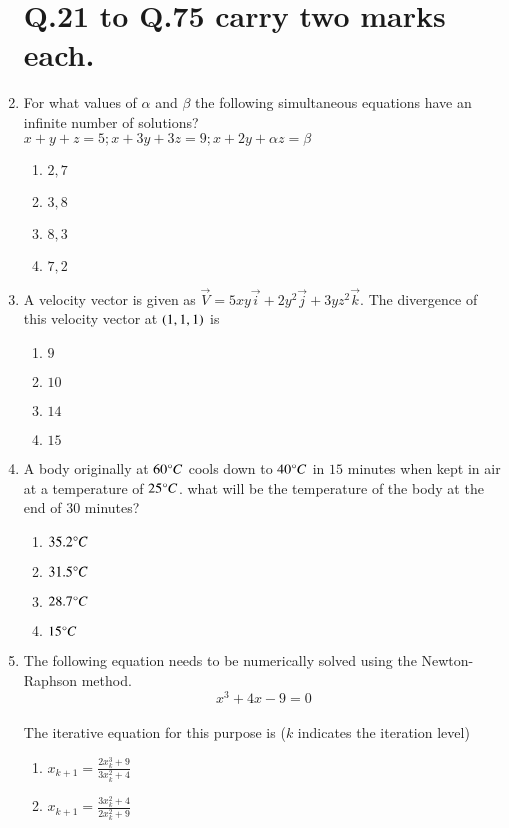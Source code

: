 \documentclass[journal,12pt,onecolumn]{IEEEtran}
\theoremstyle{remark}
\begin{document}
\begin{enumerate}[start=18]
		\section*{Q.21 to Q.75 carry two marks each.}
\item For what values of $\alpha$ and $\beta$ the following simultaneous equations have an infinite number of solutions?\\ $x+y+z=5;  x+3y+3z=9;  x+2y+\alpha z= \beta$
	\begin{enumerate}
                \item $2,7$
                \item $3,8$
                \item $8,3$
                \item $7,2$
        \end{enumerate}
\item A velocity vector is given as $\vec{V}= 5xy\overrightarrow{i}+2y^2\overrightarrow{j}+3yz^2\overrightarrow{k}$. The divergence of this velocity vector at $\left(1,1,1\right)$ is
	\begin{enumerate}
                \item $9$
                \item $10$
                \item $14$
                \item $15$
        \end{enumerate}
\item A body originally at $60{\degree}C$ cools down to $40{\degree}C$ in $15$ minutes when kept in air at a temperature of $25{\degree}C$. what will be the temperature of the body at the end of $30$ minutes?
	\begin{enumerate}
		\item $35.2{\degree}C$
                \item $31.5{\degree}C$
                \item $28.7{\degree}C$
                \item $15{\degree}C$
        \end{enumerate}
\item The following equation needs to be numerically solved using the Newton-Raphson method.\\ $$x^3+4x-9=0$$\\The iterative equation for this purpose is ($k$ indicates the iteration level)
	\begin{enumerate}
		\item $x_{k+1}=\frac{2x_k^3+9}{3x_k^2+4}$
		\item $x_{k+1}=\frac{3x_k^2+4}{2x_k^2+9}$

\end{enumerate}
\end{enumerate}
\end{document}
